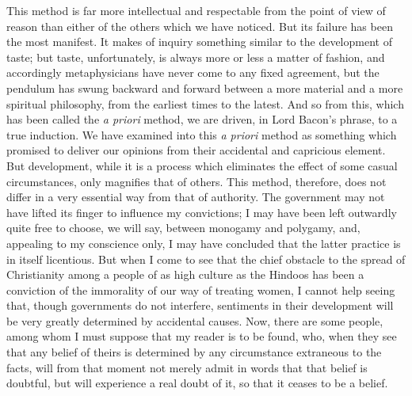 \documentclass[]{article}
\begin{document}
This method is far more intellectual and respectable from the point of view of reason than either of the others which we have noticed. But its failure has been the most manifest. It makes of inquiry something similar to the development of taste; but taste, unfortunately, is always more or less a matter of fashion, and accordingly metaphysicians have never come to any fixed agreement, but the pendulum has swung backward and forward between a more material and a more spiritual philosophy, from the earliest times to the latest. And so from this, which has been called the \emph{a priori} method, we are driven, in Lord Bacon's phrase, to a true induction. We have examined into this \emph{a priori} method as something which promised to deliver our opinions from their accidental and capricious element. But development, while it is a process which eliminates the effect of some casual circumstances, only magnifies that of others. This method, therefore, does not differ in a very essential way from that of authority. The government may not have lifted its finger to influence my convictions; I may have been left outwardly quite free to choose, we will say, between monogamy and polygamy, and, appealing to my conscience only, I may have concluded that the latter practice is in itself licentious. But when I come to see that the chief obstacle to the spread of Christianity among a people of as high culture as the Hindoos has been a conviction of the immorality of our way of treating women, I cannot help seeing that, though governments do not interfere, sentiments in their development will be very greatly determined by accidental causes. Now, there are some people, among whom I must suppose that my reader is to be found, who, when they see that any belief of theirs is determined by any circumstance extraneous to the facts, will from that moment not merely admit in words that that belief is doubtful, but will experience a real doubt of it, so that it ceases to be a belief.
\end{document}
